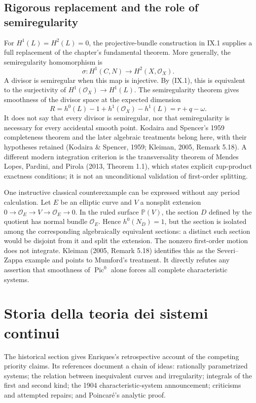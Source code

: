\subsection{Rigorous replacement and the role of semiregularity}\label{cp2-ix-5-5}

For \(H^1(L)=H^2(L)=0\), the projective-bundle construction in IX.1 supplies a full replacement of the chapter's fundamental theorem. More generally, the semiregularity homomorphism is
\[
\sigma:H^1(C,N)\longrightarrow H^2(X,\mathcal O_X).
\]
A divisor is semiregular when this map is injective. By (IX.1), this is equivalent to the surjectivity of \(H^1(\mathcal O_X)\to H^1(L)\). The semiregularity theorem gives smoothness of the divisor space at the expected dimension
\[
R=h^0(L)-1+h^1(\mathcal O_X)-h^1(L)
  =r+q-\omega.
\]
It does not say that every divisor is semiregular, nor that semiregularity is necessary for every accidental smooth point. Kodaira and Spencer's 1959 completeness theorem and the later algebraic treatments belong here, with their hypotheses retained (Kodaira \& Spencer, 1959; Kleiman, 2005, Remark 5.18). A different modern integration criterion is the transversality theorem of Mendes Lopes, Pardini, and Pirola (2013, Theorem 1.1), which states explicit cup-product exactness conditions; it is not an unconditional validation of first-order splitting.

One instructive classical counterexample can be expressed without any period calculation. Let \(E\) be an elliptic curve and \(V\) a nonsplit extension \(0\to\mathcal O_E\to V\to\mathcal O_E\to0\). In the ruled surface \(\mathbb P(V)\), the section \(D\) defined by the quotient has normal bundle \(\mathcal O_E\). Hence \(h^0(N_D)=1\), but the section is isolated among the corresponding algebraically equivalent sections: a distinct such section would be disjoint from it and split the extension. The nonzero first-order motion does not integrate. Kleiman (2005, Remark 5.18) identifies this as the Severi--Zappa example and points to Mumford's treatment. It directly refutes any assertion that smoothness of \(\operatorname{Pic}^0\) alone forces all complete characteristic systems.



\section{Storia della teoria dei sistemi continui}\label{cp2-ix-6}

The historical section gives Enriques's retrospective account of the competing priority claims. Its references document a chain of ideas: rationally parametrized systems; the relation between inequivalent curves and irregularity; integrals of the first and second kind; the 1904 characteristic-system announcement; criticisms and attempted repairs; and Poincaré's analytic proof.

